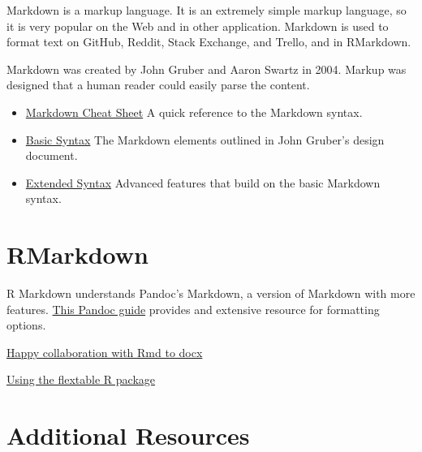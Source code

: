 \documentclass[
]{book}
\providecommand{\tightlist}{%
  \setlength{\itemsep}{0pt}\setlength{\parskip}{0pt}}
\begin{document}
Markdown is a markup language. It is an extremely simple markup language, so it is very popular on the Web and in other application. Markdown is used to format text on GitHub, Reddit, Stack Exchange, and Trello, and in RMarkdown.

Markdown was created by John Gruber and Aaron Swartz in 2004. Markup was designed that a human reader could easily parse the content.

\begin{itemize}
\tightlist
\item
  \href{https://www.markdownguide.org/cheat-sheet/}{Markdown Cheat Sheet}
  A quick reference to the Markdown syntax.
\item
  \href{https://www.markdownguide.org/basic-syntax/}{Basic Syntax}
  The Markdown elements outlined in John Gruber's design document.
\item
  \href{https://www.markdownguide.org/extended-syntax/}{Extended Syntax}
  Advanced features that build on the basic Markdown syntax.
\end{itemize}

\hypertarget{rmarkdown-1}{%
\section{RMarkdown}\label{rmarkdown-1}}

R Markdown understands Pandoc's Markdown, a version of Markdown with more features. \href{https://pandoc.org/MANUAL.html\#pandocs-markdown}{This Pandoc guide} provides and extensive resource for formatting options.

\href{https://rmarkdown.rstudio.com/articles_docx.html}{Happy collaboration with Rmd to docx}

\href{https://ardata-fr.github.io/flextable-book/index.html}{Using the flextable R package}

\hypertarget{additional-resources}{%
\section{Additional Resources}\label{additional-resources}}
\end{document}
